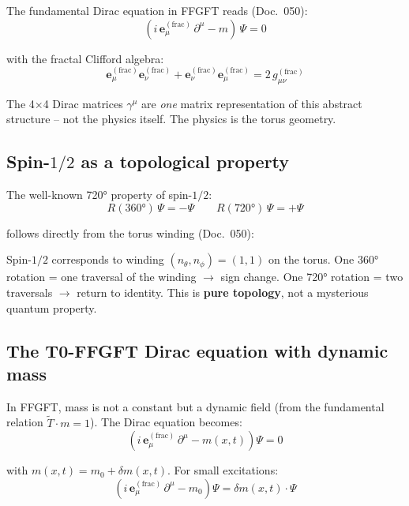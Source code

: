 The fundamental Dirac equation in FFGFT reads (Doc.~050):
\begin{equation}
    (i\,\mathbf{e}_\mu^{(\mathrm{frac})}\,\partial^\mu - m)\,\Psi = 0
\end{equation}

with the fractal Clifford algebra:
\begin{equation}
    \mathbf{e}_\mu^{(\mathrm{frac})} \mathbf{e}_\nu^{(\mathrm{frac})}
    + \mathbf{e}_\nu^{(\mathrm{frac})} \mathbf{e}_\mu^{(\mathrm{frac})}
    = 2\,g_{\mu\nu}^{(\mathrm{frac})}
\end{equation}

The 4×4 Dirac matrices $\gamma^\mu$ are \emph{one} matrix representation
of this abstract structure -- not the physics itself. The physics is
the torus geometry.

\subsection{Spin-$1/2$ as a topological property}

The well-known 720° property of spin-$1/2$:
\begin{equation}
    R(360°)\,\Psi = -\Psi \qquad R(720°)\,\Psi = +\Psi
\end{equation}

follows directly from the torus winding (Doc.~050):

\begin{keybox}
Spin-$1/2$ corresponds to winding $(n_\theta, n_\phi) = (1,1)$ on
the torus. One 360° rotation = one traversal of the winding $\to$
sign change. One 720° rotation = two traversals $\to$ return to
identity. This is \textbf{pure topology}, not a mysterious quantum
property.
\end{keybox}

\subsection{The T0-FFGFT Dirac equation with dynamic mass}

In FFGFT, mass is not a constant but a dynamic field (from the
fundamental relation $\tilde{T}\cdot m = 1$). The Dirac equation becomes:
\begin{equation}
    \left(i\,\mathbf{e}_\mu^{(\mathrm{frac})}\,\partial^\mu
    - m(x,t)\right)\Psi = 0
\end{equation}

with $m(x,t) = m_0 + \delta m(x,t)$. For small excitations:
\begin{equation}
    \left(i\,\mathbf{e}_\mu^{(\mathrm{frac})}\,\partial^\mu - m_0\right)\Psi
    = \delta m(x,t)\cdot\Psi
\end{equation}


